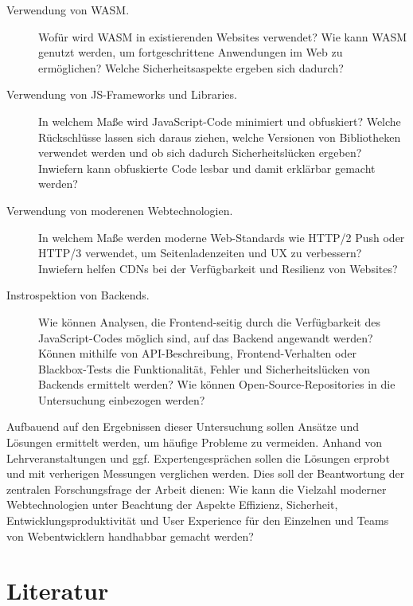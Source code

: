 \begin{description}
    \item[Verwendung von WASM.]
    Wofür wird WASM in existierenden Websites verwendet?
    Wie kann WASM genutzt werden, um fortgeschrittene Anwendungen im Web zu ermöglichen?
    Welche Sicherheitsaspekte ergeben sich dadurch?
    \item[Verwendung von JS-Frameworks und Libraries.]
    In welchem Maße wird JavaScript-Code minimiert und obfuskiert?
    Welche Rückschlüsse lassen sich daraus ziehen, welche Versionen von Bibliotheken verwendet werden und ob sich dadurch Sicherheitslücken ergeben?
    Inwiefern kann obfuskierte Code lesbar und damit erklärbar gemacht werden?
    \item[Verwendung von moderenen Webtechnologien.]
    In welchem Maße werden moderne Web-Standards wie HTTP/2 Push oder HTTP/3 verwendet, um Seitenladenzeiten und UX zu verbessern?
    Inwiefern helfen CDNs bei der Verfügbarkeit und Resilienz von Websites?
    \item[Instrospektion von Backends.]
    Wie können Analysen, die Frontend-seitig durch die Verfügbarkeit des JavaScript-Codes möglich sind, auf das Backend angewandt werden?
    Können mithilfe von API-Beschreibung, Frontend-Verhalten oder Blackbox-Tests die Funktionalität, Fehler und Sicherheitslücken von Backends ermittelt werden?
    Wie können Open-Source-Repositories in die Untersuchung einbezogen werden?
\end{description}

Aufbauend auf den Ergebnissen dieser Untersuchung sollen Ansätze und Lösungen ermittelt werden, um häufige Probleme zu vermeiden.
Anhand von Lehrveranstaltungen und ggf. Expertengesprächen sollen die Lösungen erprobt und mit verherigen Messungen verglichen werden.
Dies soll der Beantwortung der zentralen Forschungsfrage der Arbeit dienen:
Wie kann die Vielzahl moderner Webtechnologien unter Beachtung der Aspekte Effizienz, Sicherheit, Entwicklungsproduktivität und User Experience für den Einzelnen und Teams von Webentwicklern handhabbar gemacht werden?

\section*{Literatur}

